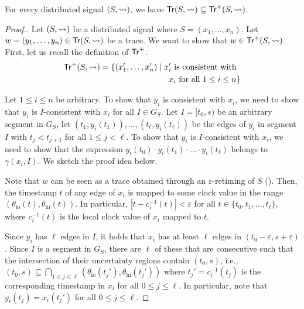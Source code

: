 \begin{lemma} \label{cl:trsound}
	For every distributed signal $(S,{\rightsquigarrow})$, we have $\mathsf{Tr}(S,{\rightsquigarrow}) \subseteq \mathsf{Tr}^+(S,{\rightsquigarrow})$.
\end{lemma}
\begin{proof}[\normalsize Proof.]
	\normalsize
	Let $(S,{\rightsquigarrow})$ be a distributed signal where $S = (x_1, \ldots, x_n)$.
	Let $w = (y_1, \ldots, y_n) \in \mathsf{Tr}(S,{\rightsquigarrow})$ be a trace.
	We want to show that $w \in \mathsf{Tr}^+(S,{\rightsquigarrow})$.
	First, let us recall the definition of $\mathsf{Tr}^+$.
	\begin{align*}
		\tr^+(S,{\hb}) = \{ (x_1', \ldots, x_n') \st \text{$x_i'$ is consistent with}&\\
		\text{$x_i$ for all $1 \leq i \leq n$}&\} 
	\end{align*}
	
	Let $1 \leq i \leq n$ be arbitrary.
	To show that $y_i$ is consistent with $x_i$, we need to show that $y_i$ is $I$-consistent with $x_i$ for all $I \in G_S$.
	Let $I = [t_0, s)$ be an arbitrary segment in $G_S$, let $(t_1, y_i(t_1)), \ldots, (t_\ell, y_i(t_\ell))$ be the edges of $y_i$ in segment $I$ with $t_j < t_{j+1}$ for all $1 \leq j < \ell$.
	To show that $y_i$ is $I$-consistent with $x_i$, we need to show that the expression $y_i(t_0) \cdot y_i(t_1) \cdot \ldots \cdot y_i(t_\ell)$ belongs to $\gamma(x_i,I)$.
	We sketch the proof idea below.
	
	Note that $w$ can be seen as a trace obtained through an $\varepsilon$-retiming of $S$ (\cite[Section 4.2]{MomtazAB23}).
	Then, the timestamp $t$ of any edge of $x_i$ is mapped to some clock value in the range $(\theta_{\text{lo}}(t), \theta_{\text{hi}}(t))$.
	In particular, $|t - c^{-1}_i(t)| < \varepsilon$ for all $t \in \{t_0, t_1, \ldots, t_\ell\}$, where $c^{-1}_i(t)$ is the local clock value of $x_i$ mapped to $t$.
	
	Since $y_i$ has $\ell$ edges in $I$, it holds that $x_i$ has at least $\ell$ edges in $(t_0 - \varepsilon, s + \varepsilon)$.
	Since $I$ is a segment in $G_S$, there are $\ell$ of these that are consecutive such that the intersection of their uncertainty regions contain $(t_0,s)$, i.e., $(t_0,s) \subseteq \bigcap_{1 \leq j \leq \ell} (\theta_{\text{lo}}(t_j'), \theta_{\text{hi}}(t_j'))$ where $t_j' = c^{-1}_i(t_j)$ is the corresponding timestamp in $x_i$ for all $0 \leq j \leq \ell$.
	In particular, note that $y_i(t_j) = x_i(t_j')$ for all $0 \leq j \leq \ell$.
	

\end{proof}

